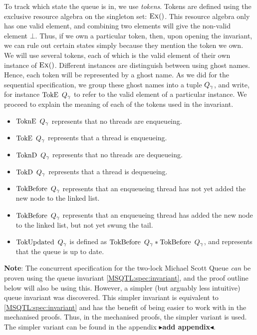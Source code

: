 \documentclass[twoside,11pt,openright]{report}
\newtheorem{definition}{Definition}[section]
\newcommand{\Qgnames}{Q_\gname}
\newcommand{\TokE}[1]{\operatorname{TokE}\ #1}
\newcommand{\TokEQg}{\TokE{\Qgnames}}
\newcommand{\ToknE}[1]{\operatorname{ToknE}\ #1}
\newcommand{\ToknEQg}{\ToknE{\Qgnames}}
\newcommand{\TokD}[1]{\operatorname{TokD}\ #1}
\newcommand{\TokDQg}{\TokD{\Qgnames}}
\newcommand{\ToknD}[1]{\operatorname{ToknD}\ #1}
\newcommand{\ToknDQg}{\ToknD{\Qgnames}}
\newcommand{\TokBefore}[1]{\operatorname{TokBefore}\ #1}
\newcommand{\TokBeforeQg}{\TokBefore{\Qgnames}}
\newcommand{\TokAfterQg}{\TokBefore{\Qgnames}}
\newcommand{\TokUpdated}[1]{\operatorname{TokUpdated}\ #1}
\newcommand{\TokUpdatedQg}{\TokUpdated{\Qgnames}}
\newcommand{\todo}[1]{{\color[rgb]{.5,0,0}\textbf{$\blacktriangleright$#1$\blacktriangleleft$}}}
\begin{document}
To track which state the queue is in, we use \textit{tokens}. Tokens are defined using the exclusive resource algebra on the singleton set: $\textsc{Ex}{()}$. This resource algebra only has one valid element, and combining two elements will give the non-valid element $\bot$. Thus, if we own a particular token, then, upon opening the invariant, we can rule out certain states simply because they mention the token we own.\\
We will use several tokens, each of which is the valid element of their own instance of $\textsc{Ex}{()}$. Different instances are distinguish between using ghost names. Hence, each token will be represented by a ghost name. As we did for the sequential specification, we group these ghost names into a tuple $\Qgnames$, and write, for instance $\TokEQg$ to refer to the valid element of a particular instance. We proceed to explain the meaning of each of the tokens used in the invariant.
\begin{itemize}
  \item $\ToknEQg$ represents that no threads are enqueueing.
  \item $\TokEQg$ represents that a thread is enqueueing.
  \item $\ToknDQg$ represents that no threads are dequeueing.
  \item $\TokDQg$ represents that a thread is dequeueing.
  \item $\TokBeforeQg$ represents that an enqueueing thread has not yet added the new node to the linked list.
  \item $\TokAfterQg$ represents that an enqueueing thread has added the new node to the linked list, but not yet swung the tail.
  \item $\TokUpdatedQg$ is defined as $\TokBeforeQg \ast \TokAfterQg$, and represents that the queue is up to date.
\end{itemize}


\textbf{Note}: The concurrent specification for the two-lock Michael Scott Queue \textit{can} be proven using the queue invariant \ref{MSQTL:spec:invariant}, and the proof outline below will also be using this. However, a simpler (but arguably less intuitive) queue invariant was discovered. This simpler invariant is equivalent to \ref{MSQTL:spec:invariant} and has the benefit of being easier to work with in the mechanised proofs. Thus, in the mechanised proofs, the simpler variant is used. The simpler variant can be found in the appendix \todo{add appendix}.
\end{document}
